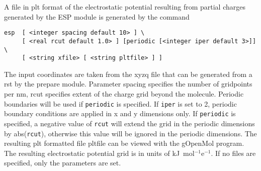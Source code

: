 A file in plt format of the electrostatic potential resulting
from partial charges generated by the ESP module is generated
by the command

\begin{verbatim}
esp  [ <integer spacing default 10> ] \
     [ <real rcut default 1.0> ] [periodic [<integer iper default 3>]] \
     [ <string xfile> [ <string pltfile> ] ]
\end{verbatim}

The input coordinates are taken from the {\rm xyzq} file that can
be generated from a {\rm rst} by the prepare module. Parameter 
spacing specifies the number of gridpoints per nm, rcut specifies 
extent of the charge grid beyond the molecule.
Periodic boundaries will be used if \verb+periodic+
is specified. If \verb+iper+ is set to 2, periodic boundary
conditions are applied in x and y dimensions only. If \verb+periodic+
is specified, a negative value of \verb+rcut+ will extend the grid
in the periodic dimensions by abs(\verb+rcut+), otherwise this value
will be ignored in the periodic dimensions.
The resulting {\rm plt} formatted file pltfile can be
viewed with the gOpenMol program. The resulting electrostatic 
potential grid is in units of kJ\ mol$^{-1}$e$^{-1}$.
If no files are specified, only the parameters are set.

